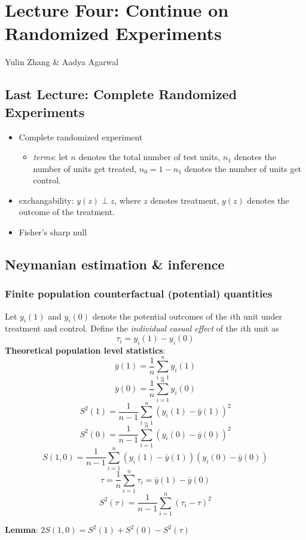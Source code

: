 \section{Lecture Four: Continue on Randomized Experiments}{Yulin Zhang \& Aadya Agarwal}
\subsection{Last Lecture: Complete Randomized Experiments}
    \begin{itemize}
        \item Complete randomized experiment
        \begin{itemize}
            \item \textit{terms}: let $n$ denotes the total number of test units, $n_1$ denotes the number of units get treated, $n_0 = 1 - n_1$ denotes the number of units get control.
        \end{itemize}
        \item exchangability: $y(z) \perp z$, where $z$ denotes treatment, $y(z)$ denotes the outcome of the treatment.
        \item Fisher's sharp null
    \end{itemize}
    
\subsection{Neymanian estimation \& inference}

\subsubsection{Finite population counterfactual (potential) quantities}
Let $y_{i}(1)$ and $y_{i}(0)$ denote the potential outcomes of the $i$th unit under treatment and control. Define the \textit{individual casual effect} of the $i$th unit as $$\tau_{i} = y_{i}(1) - y_{i}(0)$$
\textbf{Theoretical population level statistics}:\\
$$\bar{y}(1)= \frac{1}{n}\sum_{i = 1}^{n}y_i(1)$$
$$\bar{y}(0)= \frac{1}{n}\sum_{i = 1}^{n}y_i(0)$$
$$S^{2}(1) = \frac{1}{n - 1}\sum_{i = 1}^{n}(y_i(1) - \bar{y}(1))^{2}$$
$$S^{2}(0) = \frac{1}{n - 1}\sum_{i = 1}^{n}(y_i(0) - \bar{y}(0))^{2}$$
$$S(1, 0) = \frac{1}{n - 1}\sum_{i = 1}^{n}(y_i(1) - \bar{y}(1))(y_i(0) - \bar{y}(0))$$
$$\tau = \frac{1}{n}\sum_{i = 1}^{n} \tau_{i} = \bar{y}(1) - \bar{y}(0)$$
$$S^{2}(\tau) = \frac{1}{n - 1}\sum_{i = 1}^{n}(\tau_{i} - \tau)^2$$

\textbf{Lemma}: $2S(1, 0) = S^{2}(1) + S^{2}(0) - S^{2}(\tau)$ \\

